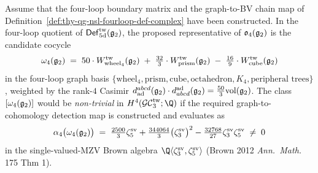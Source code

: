 \begin{proposition}
\label{thm:thy-qg-omega-4-g2}
Assume that the four-loop boundary matrix and the graph-to-BV chain map
of Definition~\ref{def:thy-qg-nsl-fourloop-def-complex} have been
constructed. In the four-loop quotient of
$\mathsf{Def}^{\mathrm{tw}}_{5\mathrm d}(\mathfrak{g}_2)$, the proposed
representative of $\mathfrak o_4(\mathfrak{g}_2)$ is the candidate cocycle
\begin{equation}
\label{eq:thy-qg-omega-4-explicit}
 \omega_4(\mathfrak{g}_2)
 \;=\;
 50 \cdot W_{\mathrm{wheel}_4}^{\mathrm{tw}}(\mathfrak{g}_2)
 \;+\;
 \tfrac{32}{3} \cdot W_{\mathrm{prism}}^{\mathrm{tw}}(\mathfrak{g}_2)
 \;-\;
 \tfrac{16}{9} \cdot W_{\mathrm{cube}}^{\mathrm{tw}}(\mathfrak{g}_2)
\end{equation}
in the four-loop graph basis $\{\mathrm{wheel}_4, \mathrm{prism},
\mathrm{cube}, \mathrm{octahedron}, K_4, \text{peripheral trees}\}$,
weighted by the rank-$4$ Casimir $d^{abcd}_{\mathrm{ad}}(\mathfrak{g}_2) \cdot
d_{abcd}^{\mathrm{ad}}(\mathfrak{g}_2) = \tfrac{50}{3} \mathrm{vol}(\mathfrak{g}_2)$.
The class $[\omega_4(\mathfrak{g}_2)]$ would be \emph{non-trivial} in
$H^4(\GCtw_3; \Q)$ if the required graph-to-cohomology detection map is
constructed and evaluates as
\begin{equation}
\label{eq:thy-qg-alpha-4-detection}
 \alpha_4\bigl(\omega_4(\mathfrak{g}_2)\bigr)
 \;=\; \tfrac{2500}{3} \zeta^{\mathrm{sv}}_5
 + \tfrac{344064}{3} \bigl(\zeta^{\mathrm{sv}}_3\bigr)^2
 - \tfrac{32768}{27} \zeta^{\mathrm{sv}}_3 \zeta^{\mathrm{sv}}_5
 \;\ne\; 0
\end{equation}
in the single-valued-MZV Brown algebra $\Q\langle
\zeta^{\mathrm{sv}}_3, \zeta^{\mathrm{sv}}_5\rangle$ (Brown 2012
\textit{Ann.\ Math.} 175 Thm 1).
\end{proposition}


